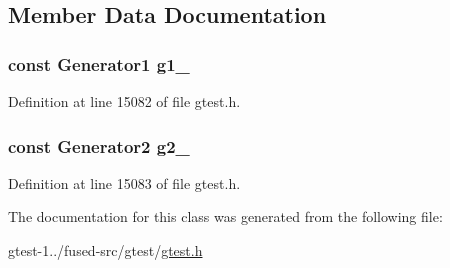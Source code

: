 \subsection{\-Member \-Data \-Documentation}
\hypertarget{classtesting_1_1internal_1_1CartesianProductHolder2_a36a04c8f9e515291d6a093ab378084f7}{
\subsubsection[{g1\-\_\-}]{\setlength{\rightskip}{0pt plus 5cm}const \-Generator1 {\bf g1\-\_\-}}}\label{da/d08/classtesting_1_1internal_1_1CartesianProductHolder2_a36a04c8f9e515291d6a093ab378084f7}


\-Definition at line 15082 of file gtest.\-h.

\hypertarget{classtesting_1_1internal_1_1CartesianProductHolder2_a6cfd9fa9a396d07747d5ebb1f05c7f22}{
\subsubsection[{g2\-\_\-}]{\setlength{\rightskip}{0pt plus 5cm}const \-Generator2 {\bf g2\-\_\-}}}\label{da/d08/classtesting_1_1internal_1_1CartesianProductHolder2_a6cfd9fa9a396d07747d5ebb1f05c7f22}


\-Definition at line 15083 of file gtest.\-h.



\-The documentation for this class was generated from the following file\-:\begin{DoxyCompactItemize}
\item 
gtest-\/1../fused-\/src/gtest/\hyperlink{fused-src_2gtest_2gtest_8h}{gtest.\-h}\end{DoxyCompactItemize}
